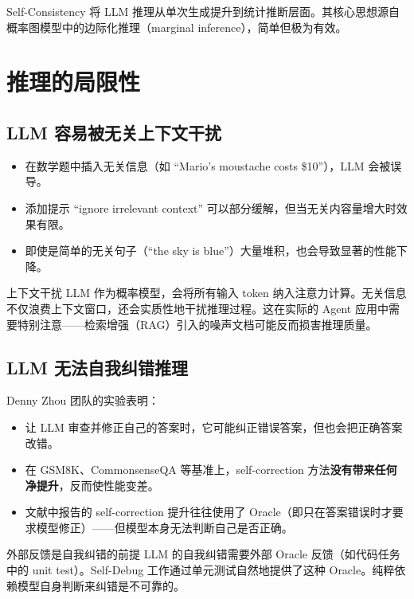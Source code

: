 \documentclass[a4paper]{article}
\begin{document}
Self-Consistency 将 LLM 推理从单次生成提升到统计推断层面。其核心思想源自概率图模型中的边际化推理（marginal inference），简单但极为有效。

\section{推理的局限性}

\subsection{LLM 容易被无关上下文干扰}

\begin{itemize}
    \item 在数学题中插入无关信息（如 ``Mario's moustache costs \$10''），LLM 会被误导。
    \item 添加提示 ``ignore irrelevant context'' 可以部分缓解，但当无关内容量增大时效果有限。
    \item 即使是简单的无关句子（``the sky is blue''）大量堆积，也会导致显著的性能下降。
\end{itemize}

\begin{warningbox}{上下文干扰}
LLM 作为概率模型，会将所有输入 token 纳入注意力计算。无关信息不仅浪费上下文窗口，还会实质性地干扰推理过程。这在实际的 Agent 应用中需要特别注意——检索增强（RAG）引入的噪声文档可能反而损害推理质量。
\end{warningbox}

\subsection{LLM 无法自我纠错推理}

Denny Zhou 团队的实验表明：

\begin{itemize}
    \item 让 LLM 审查并修正自己的答案时，它可能纠正错误答案，但也会把正确答案改错。
    \item 在 GSM8K、CommonsenseQA 等基准上，self-correction 方法\textbf{没有带来任何净提升}，反而使性能变差。
    \item 文献中报告的 self-correction 提升往往使用了 Oracle（即只在答案错误时才要求模型修正）——但模型本身无法判断自己是否正确。
\end{itemize}

\begin{importantbox}{外部反馈是自我纠错的前提}
LLM 的自我纠错需要外部 Oracle 反馈（如代码任务中的 unit test）。Self-Debug 工作通过单元测试自然地提供了这种 Oracle。纯粹依赖模型自身判断来纠错是不可靠的。
\end{importantbox}
\end{document}
